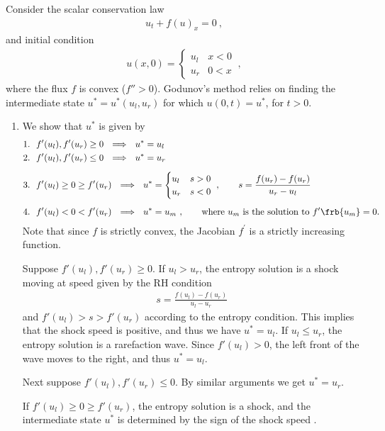 \documentclass{article}
\begin{document}
\begin{exerciseList}
\item
Consider the scalar conservation law
\begin{gather}
	u_t+f(u)_x=0\ ,
\end{gather}
and initial condition
\begin{gather}
	u(x,0)=\begin{cases}
		u_l & x<0\\
		u_r & 0<x
	\end{cases}\ ,
\end{gather}
where the flux $f$ is convex ($f''>0$).
Godunov's method relies on finding the intermediate state $u^*=u^*(u_l,u_r)$ for which $u(0,t)=u^*$, for $t>0$.
\begin{enumerate}
\item
We show that $u^*$ is given by
\begin{align*}
	&1.\ \ f'(u_l), f'(u_r)\ge 0 \ \ \Longrightarrow \ \ u^*=u_l \\
	&2.\ \ f'(u_l), f'(u_r)\le 0 \ \ \Longrightarrow \ \ u^*=u_r \\[0.5em]
	&3.\ \ f'(u_l) \ge 0\ge f'(u_r) \ \ \Longrightarrow \ \
		u^*=\begin{cases}
			u_l & s>0 \\
			u_r & s<0
		\end{cases}\ ,
		\qquad s=\frac{f(u_r)-f(u_r)}{u_r-u_l}\\[0.5em]
	&4.\ \ f'(u_l) < 0 < f'(u_r)  \ \ \Longrightarrow \ \ u^*=u_m\ ,
		\qquad\text{where $u_m$ is the solution to $f'\frb{u_m}=0$.}
\end{align*}
Note that since $f$ is strictly convex, the Jacobian $f^\prime$ is a strictly increasing function.

Suppose $f'(u_l), f'(u_r)\ge 0$.
If $u_l>u_r$, the entropy solution is a shock moving at speed given by the RH condition
\begin{gather} \label{RHJumpCond}
	s=\frac{f(u_l)-f(u_r)}{u_l-u_r}\,
\end{gather}
and $f'(u_l) > s > f'(u_r)$ according to the entropy condition.
This implies that the shock speed is positive, and thus we have $u^*=u_l$. 
If $u_l\le u_r$, the entropy solution is a rarefaction wave.
Since $f'(u_l)>0$, the left front of the wave moves to the right, and thus $u^*=u_l$.

Next suppose $f'(u_l), f'(u_r)\le 0$.
By similar arguments we get $u^*=u_r$.

If $f'(u_l) \ge 0\ge f'(u_r)$, the entropy solution is a shock, and the intermediate state $u^*$ is determined by the sign of the shock speed .


\end{enumerate}
\end{exerciseList}
\end{document}
